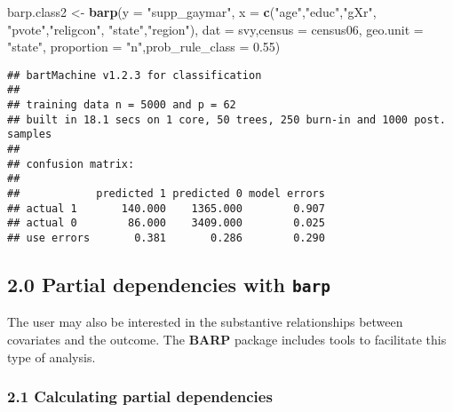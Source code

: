 \documentclass[]{article}
\newenvironment{Shaded}{\begin{snugshade}}{\end{snugshade}}
\newcommand{\KeywordTok}[1]{\textcolor[rgb]{0.13,0.29,0.53}{\textbf{#1}}}
\newcommand{\DataTypeTok}[1]{\textcolor[rgb]{0.13,0.29,0.53}{#1}}
\newcommand{\FloatTok}[1]{\textcolor[rgb]{0.00,0.00,0.81}{#1}}
\newcommand{\StringTok}[1]{\textcolor[rgb]{0.31,0.60,0.02}{#1}}
\newcommand{\OperatorTok}[1]{\textcolor[rgb]{0.81,0.36,0.00}{\textbf{#1}}}
\newcommand{\NormalTok}[1]{#1}
\begin{document}
\begin{Shaded}
\begin{Highlighting}[]
\NormalTok{barp.class2 <-}\StringTok{ }\KeywordTok{barp}\NormalTok{(}\DataTypeTok{y =} \StringTok{"supp_gaymar"}\NormalTok{,}
                 \DataTypeTok{x =} \KeywordTok{c}\NormalTok{(}\StringTok{"age"}\NormalTok{,}\StringTok{"educ"}\NormalTok{,}\StringTok{"gXr"}\NormalTok{,}
                       \StringTok{"pvote"}\NormalTok{,}\StringTok{"religcon"}\NormalTok{,}
                       \StringTok{"state"}\NormalTok{,}\StringTok{"region"}\NormalTok{),}
                 \DataTypeTok{dat =}\NormalTok{ svy,}\DataTypeTok{census =}\NormalTok{ census06,}
                 \DataTypeTok{geo.unit =} \StringTok{"state"}\NormalTok{,}
                 \DataTypeTok{proportion =} \StringTok{"n"}\NormalTok{,}\DataTypeTok{prob_rule_class =} \FloatTok{0.55}\NormalTok{)}
\end{Highlighting}
\end{Shaded}

\begin{Shaded}
\end{Shaded}

\begin{verbatim}
## bartMachine v1.2.3 for classification
## 
## training data n = 5000 and p = 62 
## built in 18.1 secs on 1 core, 50 trees, 250 burn-in and 1000 post. samples
## 
## confusion matrix:
## 
##            predicted 1 predicted 0 model errors
## actual 1       140.000    1365.000        0.907
## actual 0        86.000    3409.000        0.025
## use errors       0.381       0.286        0.290
\end{verbatim}

\subsection{\texorpdfstring{2.0 Partial dependencies with
\texttt{barp}}{2.0 Partial dependencies with barp}}\label{partial-dependencies-with-barp}

The user may also be interested in the substantive relationships between
covariates and the outcome. The \textbf{BARP} package includes tools to
facilitate this type of analysis.

\subsubsection{2.1 Calculating partial
dependencies}\label{calculating-partial-dependencies}
\end{document}

